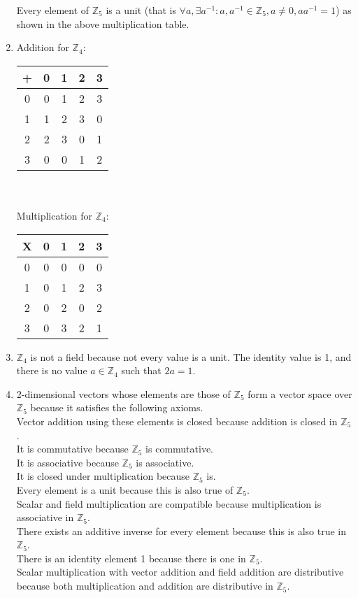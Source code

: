 \documentclass[sigconf]{article}
\begin{document}
\begin{enumerate}
      Every element of $\mathbb{Z}_5$ is a unit (that is $\forall a, \exists a^{-1}: a,a^{-1}\in\mathbb{Z}_5, a\neq0, aa^{-1}=1$) as shown in the above multiplication table.
      \clearpage
  \item Addition for $\mathbb{Z}_4$:\\
    \begin{tabular}{c|cccc}
      + & 0 & 1 & 2 & 3 \\
      \hline
      0 & 0 & 1 & 2 & 3 \\
      1 & 1 & 2 & 3 & 0 \\
      2 & 2 & 3 & 0 & 1 \\
      3 & 0 & 0 & 1 & 2 \\
    \end{tabular}\\\\
    Multiplication for $\mathbb{Z}_4$:\\
    \begin{tabular}{c|cccc}
      X & 0 & 1 & 2 & 3 \\
      \hline
      0 & 0 & 0 & 0 & 0 \\
      1 & 0 & 1 & 2 & 3 \\
      2 & 0 & 2 & 0 & 2 \\
      3 & 0 & 3 & 2 & 1 \\
    \end{tabular}
  \item $\mathbb{Z}_4$ is not a field because not every value is a unit. The identity value is 1, and there is no value $a\in\mathbb{Z}_4$ such that $2a=1$.
  \item 2-dimensional vectors whose elements are those of $\mathbb{Z}_5$ form a vector space over $\mathbb{Z}_5$ because it satisfies the following axioms.\\
      Vector addition using these elements is closed because addition is closed in $\mathbb{Z}_5$.\\
      It is commutative because $\mathbb{Z}_5$ is commutative.\\
      It is associative because $\mathbb{Z}_5$ is associative.\\
      It is closed under multiplication because $\mathbb{Z}_5$ is.\\
      Every element is a unit because this is also true of $\mathbb{Z}_5$.\\
      Scalar and field multiplication are compatible because multiplication is associative in $\mathbb{Z}_5$.\\
      There exists an additive inverse for every element because this is also true in $\mathbb{Z}_5$.\\
      There is an identity element 1 because there is one in $\mathbb{Z}_5$.\\
      Scalar multiplication with vector addition and field addition are distributive because both multiplication and addition are distributive in $\mathbb{Z}_5$.
\end{enumerate}
\end{document}
